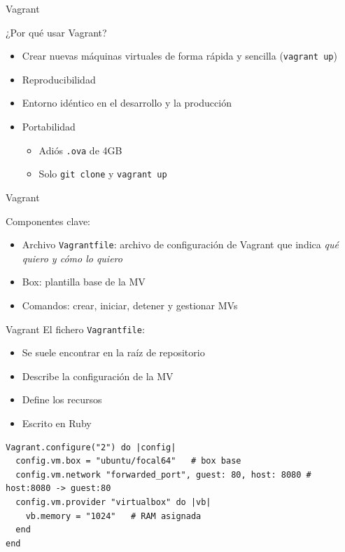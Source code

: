 \documentclass{beamer}
\begin{document}
\begin{frame}{Vagrant}

¿Por qué usar Vagrant?

\begin{itemize}
    \item Crear nuevas máquinas virtuales de forma rápida y sencilla (\texttt{vagrant up})
    \item Reproducibilidad
    \item Entorno idéntico en el desarrollo y la producción
    \item Portabilidad
    \begin{itemize}
        \item Adiós \texttt{.ova} de 4GB
        \item Solo \texttt{git clone} y \texttt{vagrant up}
    \end{itemize}

\end{itemize}
    
\end{frame}

\begin{frame}{Vagrant}

Componentes clave:

\begin{itemize}
    \item Archivo \texttt{Vagrantfile}: archivo de configuración de Vagrant que indica \textit{qué quiero y cómo lo quiero}
    \item Box: plantilla base de la MV
    \item Comandos: crear, iniciar, detener y gestionar MVs
\end{itemize}
    
\end{frame}

\begin{frame}[fragile]{Vagrant}
El fichero \texttt{Vagrantfile}:
\begin{itemize}
    \item Se suele encontrar en la raíz de repositorio
    \item Describe la configuración de la MV
    \item Define los recursos
    \item Escrito en Ruby
\end{itemize}

\vspace{5pt}
\begin{verbatim}
Vagrant.configure("2") do |config|
  config.vm.box = "ubuntu/focal64"   # box base
  config.vm.network "forwarded_port", guest: 80, host: 8080 # host:8080 -> guest:80  
  config.vm.provider "virtualbox" do |vb|
    vb.memory = "1024"   # RAM asignada
  end
end

\end{verbatim}
\end{frame}
\end{document}
